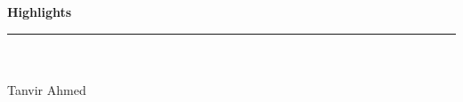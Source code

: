 \documentclass[11pt]{article}
\begin{document}
{\large\bfseries Highlights}\\[2mm]
\rule{\textwidth}{0.4pt}\\[3mm]
{\bfseries \PaperTitle}\\[2mm]
Tanvir Ahmed\\[5mm]
\begin{itemize}[leftmargin=5mm,itemsep=2.5mm,topsep=0pt]

\end{itemize}
\end{document}
